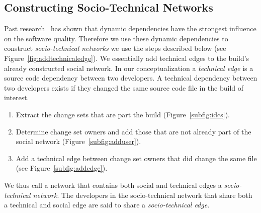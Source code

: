 \documentclass[12pt,oneside]{book}
\begin{document}
\subsection{Constructing Socio-Technical Networks}
\label{subsec:technical}
Past research~\cite{nagappan:icse:2005} has shown that dynamic dependencies have the strongest influence on the software quality.
Therefore we use these dynamic dependencies
to construct \emph{socio-technical networks} we use the steps described below
(see Figure~\ref{fig:addtechnicaledge}). We essentially add technical edges to
the build's already constructed social network. In our conceptualization a \emph{technical edge} is a source code
dependency between two developers. A technical dependency between two developers
exists if they changed the same source code file in the build of interest. 

\begin{enumerate}
\item Extract the change sets that are part the build (Figure~\ref{subfig:idcs}).
\item Determine change set owners and add those  that are not already part
of the social network (Figure~\ref{subfig:adduser}).
\item Add a technical edge between change set owners that did change the same file (see Figure~\ref{subfig:addedge}).
\end{enumerate}


We thus call a network that contains both social and technical edges a
\emph{socio-technical network}. The developers in the 
socio-technical network that share both a technical and social edge are said to share
a \emph{socio-technical edge}.
\end{document}
